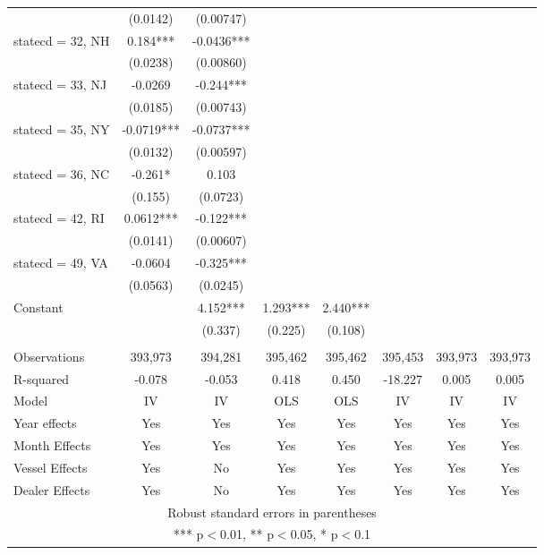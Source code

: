 \begin{tabular}{lccccccc}
 & (0.0142) & (0.00747) &  &  &  &  &  \\
statecd = 32, NH & 0.184*** & -0.0436*** &  &  &  &  &  \\
 & (0.0238) & (0.00860) &  &  &  &  &  \\
statecd = 33, NJ & -0.0269 & -0.244*** &  &  &  &  &  \\
 & (0.0185) & (0.00743) &  &  &  &  &  \\
statecd = 35, NY & -0.0719*** & -0.0737*** &  &  &  &  &  \\
 & (0.0132) & (0.00597) &  &  &  &  &  \\
statecd = 36, NC & -0.261* & 0.103 &  &  &  &  &  \\
 & (0.155) & (0.0723) &  &  &  &  &  \\
statecd = 42, RI & 0.0612*** & -0.122*** &  &  &  &  &  \\
 & (0.0141) & (0.00607) &  &  &  &  &  \\
statecd = 49, VA & -0.0604 & -0.325*** &  &  &  &  &  \\
 & (0.0563) & (0.0245) &  &  &  &  &  \\
Constant &  & 4.152*** & 1.293*** & 2.440*** &  &  &  \\
 &  & (0.337) & (0.225) & (0.108) &  &  &  \\
 &  &  &  &  &  &  &  \\
Observations & 393,973 & 394,281 & 395,462 & 395,462 & 395,453 & 393,973 & 393,973 \\
R-squared & -0.078 & -0.053 & 0.418 & 0.450 & -18.227 & 0.005 & 0.005 \\
Model & IV & IV & OLS & OLS & IV & IV & IV \\
Year effects & Yes & Yes & Yes & Yes & Yes & Yes & Yes \\
Month Effects & Yes & Yes & Yes & Yes & Yes & Yes & Yes \\
Vessel Effects & Yes & No & Yes & Yes & Yes & Yes & Yes \\
 Dealer Effects & Yes & No & Yes & Yes & Yes & Yes & Yes \\ \hline
\multicolumn{8}{c}{ Robust standard errors in parentheses} \\
\multicolumn{8}{c}{ *** p$<$0.01, ** p$<$0.05, * p$<$0.1} \\
\end{tabular}
